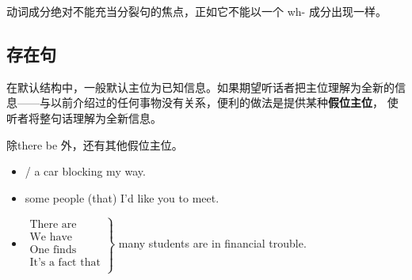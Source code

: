 动词成分绝对不能充当分裂句的焦点，正如它不能以一个 wh- 成分出现一样。


\subsection{存在句}

在默认结构中，一般默认主位为已知信息。如果期望听话者把主位理解为全新的信
息——与以前介绍过的任何事物没有关系，便利的做法是提供某种\textbf{假位主位}，
使听者将整句话理解为全新信息。

除there be 外，还有其他假位主位。

\begin{itemize}
\item {} /  a car blocking my way.

\item{} some people (that) I'd like you to meet.

\item $\left.
    \begin{aligned}
      \text{There are} \\
      \text{We have} \\
      \text{One finds} \\
      \text{It's a fact that} \\
    \end{aligned}
  \right\}$ many students are in financial trouble.
\end{itemize}



